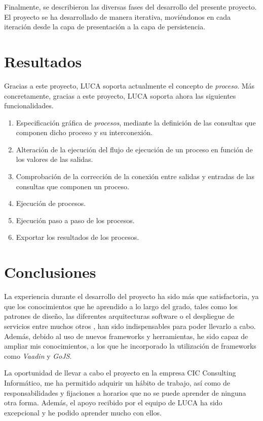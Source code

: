 Finalmente, se describieron las diversas fases del desarrollo del presente proyecto. El proyecto se ha desarrollado de manera iterativa, moviéndonos en cada iteración desde la capa de presentación a la capa de persistencia. 

\section{Resultados}

Gracias a este proyecto, LUCA soporta actualmente el concepto de \emph{proceso}. Más concretamente, gracias a este proyecto, LUCA soporta ahora las siguientes funcionalidades. 

\begin{enumerate}
	\item Especificación gráfica de \emph{procesos}, mediante la definición de las consultas que componen dicho proceso y su interconexión.
	\item Alteración de la ejecución del flujo de ejecución de un proceso en función de los valores de las salidas.
    \item Comprobación de la corrección de la conexión entre salidas y entradas de las consultas que componen un proceso.
    \item Ejecución de procesos.
	\item Ejecución paso a paso de los procesos.
	\item Exportar los resultados de los procesos.
\end{enumerate}

\section{Conclusiones}


La experiencia durante el desarrollo del proyecto ha sido más que satisfactoria, ya que los conocimientos que he aprendido a lo largo del grado, tales como los patrones de diseño, las diferentes arquitecturas software o el despliegue de servicios entre muchos otros , han sido indispensables para poder llevarlo a cabo. Además, debido al uso de nuevos frameworks y herramientas, he sido capaz de ampliar mis conocimientos, a los que he incorporado la utilización de frameworks como \emph{Vaadin} y \emph{GoJS}.

La oportunidad de llevar a cabo el proyecto en la empresa CIC Consulting Informático, me ha permitido adquirir un hábito de trabajo, así como de responsabilidades y fijaciones a horarios que no se puede aprender de ninguna otra forma. Además, el apoyo recibido por el equipo de LUCA ha sido excepcional y he podido aprender mucho con ellos.

